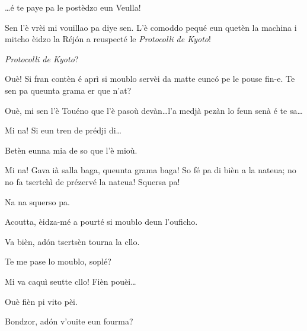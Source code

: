 \begin{drama}
\Sandrinospeaks \ldots é te paye pa le postèdzo eun Veulla!

\Richardspeaks Sen l'è vrèi mi vouillao pa diye sen. L'è comoddo pequé eun quetèn la machina i mitcho èidzo la Réj\'on a reuspecté le \textit{Protocolli de Kyoto}! 

\Sandrinospeaks \textit{Protocolli de Kyoto}?

\Richardspeaks Ouè! Si fran contèn é aprì si moublo servèi da matte eunc\'o pe le pouse fin-e. Te sen pa  queunta grama er que n'at? 

\Sandrinospeaks Ouè, mi sen l'è Touéno que l'è pasoù devàn\ldots l'a medjà pezàn lo feun senà é te sa\ldots

\Richardspeaks Mi na! Si eun tren de prédji di\ldots


\Sandrinospeaks Betèn eunna mia de so que l'è mioù.

\Richardspeaks Mi na! Gava ià salla baga, queunta grama baga! So fé pa di bièn a la nateua; no no fa tsertchì de prézervé la nateua! Squersa pa!

\Sandrinospeaks Na na squerso pa.

\Richardspeaks Acoutta, èidza-mé a pourté si moublo deun l'ouficho.

\Sandrinospeaks Va bièn, ad\'on tsertsèn tourna la cllo.


\Richardspeaks Te me pase lo moublo, soplé?


\Sandrinospeaks{} Mi va caquì seutte cllo! Fièn pouèi\ldots


\Richardspeaks{} Ouè fièn pi vito pèi.



\Richardspeaks{} Bondzor, ad\'on v'ouite eun fourma?


\end{drama}
